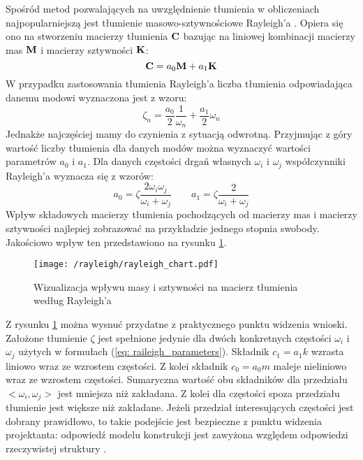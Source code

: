 Spośród metod pozwalających na uwzględnienie tłumienia w obliczeniach najpopularniejszą jest tłumienie masowo-sztywnościowe Rayleigh'a \parencite{Chopra2012a}. Opiera się ono na stworzeniu macierzy tłumienia $\mathbf{C}$ bazując na liniowej kombinacji macierzy mas $\mathbf{M}$ i macierzy sztywności $\mathbf{K}$:
\begin{equation} \label{eq: rayleigh_damping}
	\mathbf{C}=a_0\mathbf{M}+a_1\mathbf{K}
\end{equation}
W przypadku zastosowania tłumienia Rayleigh'a liczba tłumienia odpowiadająca danemu modowi wyznaczona jest z wzoru:
\begin{equation} \label{eq: damping_rayleigh}
	\zeta_n = \frac{a_0}{2}\frac{1}{\omega_n} + \frac{a_1}{2}\omega_n
\end{equation}
Jednakże najczęściej mamy do czynienia z sytuacją odwrotną. Przyjmując z góry wartość liczby tłumienia dla danych modów można wyznaczyć wartości parametrów $a_0$ i $a_1$. Dla danych częstości drgań własnych $\omega_i$ i $\omega_j$ współczynniki Rayleigh'a wyznacza się z wzorów:
\begin{equation} \label{eq: raileigh_parameters}
	a_0 = \zeta\frac{2\omega_i\omega_j}{\omega_i+\omega_j} \qquad a_1 = \zeta\frac{2}{\omega_i+\omega_j}
\end{equation}
Wpływ składowych macierzy tłumienia pochodzących od macierzy mas i macierzy sztywności najlepiej zobrazować na przykładzie jednego stopnia swobody. Jakościowo wpływ ten przedstawiono na rysunku \ref{fig: rayleigh_chart}.

\begin{figure}[hbt!] 
	\centering
	\texttt{[image: /rayleigh/rayleigh\_chart.pdf]}
	\captionsetup{justification=centering}
	\caption{Wizualizacja wpływu masy i sztywności na macierz tłumienia według Rayleigh'a}
	\label{fig: rayleigh_chart}
\end{figure}

Z rysunku \ref{fig: rayleigh_chart} można wysnuć przydatne z praktycznego punktu widzenia wnioski. Założone tłumienie $\zeta$ jest spełnione jedynie dla dwóch konkretnych częstości $\omega_i$ i $\omega_j$ użytych w formułach (\ref{eq: raileigh_parameters}). Składnik $c_1=a_1 k$ wzrasta liniowo wraz ze wzrostem częstości. Z kolei składnik $c_0 = a_0 m$ maleje nieliniowo wraz ze wzrostem częstości. Sumaryczna wartość obu składników dla przedziału $<\omega_i ,\omega_j>$ jest mniejsza niż zakładana. Z kolei dla częstości spoza przedziału tłumienie jest większe niż zakładane. Jeżeli przedział interesujących częstości jest dobrany prawidłowo, to takie podejście jest bezpieczne z punktu widzenia projektanta: odpowiedź modelu konstrukcji jest zawyżona względem odpowiedzi rzeczywistej struktury \parencite{Oleszek2015}.


